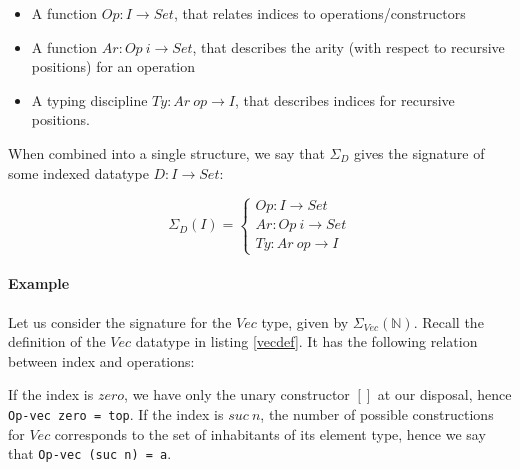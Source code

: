 \documentclass[11pt]{article}
\newcommand{\Conid}[1]{\mathit{#1}}
\newcommand{\Varid}[1]{\mathit{#1}}
\def\resethooks{%
  \global\let\SaveRestoreHook\empty
  \global\let\ColumnHook\empty}
\let\hspre\empty
\let\hspost\empty
\renewcommand\Varid[1]{\mathord{\textsf{#1}}}
\let\Conid\Varid
\begin{document}
\begin{itemize}
\item 
A function $Op : I \rightarrow Set$, that relates indices to operations/constructors

\item 
A function $Ar : Op\ i \rightarrow Set$, that describes the arity (with respect to recursive positions) for an operation 

\item 
A typing discipline $Ty : Ar\ op \rightarrow I$, that describes indices for recursive positions. 

\end{itemize}

When combined into a single structure, we say that $\Sigma_D$ gives the signature of some indexed datatype $D : I \rightarrow Set$:  

\begin{equation*}
\Sigma_D(I)=
\begin{cases}
Op : I \rightarrow Set \\
Ar : Op\ i \rightarrow Set \\
Ty : Ar\ op \rightarrow I
\end{cases}
\end{equation*}

\paragraph{Example} Let us consider the signature for the $Vec$ type, given by $\Sigma_{Vec}(\mathbb{N})$. Recall the definition of the $Vec$ datatype in listing \ref{vecdef}. It has the following relation between index and operations: 

\resethooks

If the index is $zero$, we have only the unary constructor $[]$ at our disposal, hence \texttt{Op-vec zero = top}. If the index is $suc\ n$, the number of possible constructions for $Vec$ corresponds to the set of inhabitants of its element type, hence we say that \texttt{Op-vec (suc n) = a}. 
\end{document}
